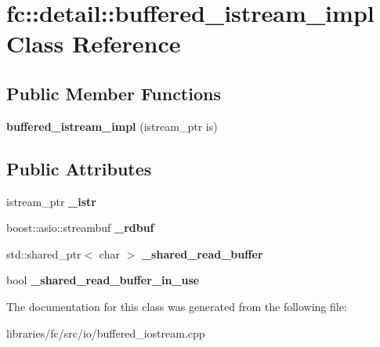 \hypertarget{classfc_1_1detail_1_1buffered__istream__impl}{}\section{fc\+:\+:detail\+:\+:buffered\+\_\+istream\+\_\+impl Class Reference}
\label{classfc_1_1detail_1_1buffered__istream__impl}
\subsection*{Public Member Functions}
\begin{DoxyCompactItemize}
\item 
\mbox{\label{classfc_1_1detail_1_1buffered__istream__impl_af20f26d197bdb35d0d6ecff86af7bad1}} 
{\bfseries buffered\+\_\+istream\+\_\+impl} (istream\+\_\+ptr is)
\end{DoxyCompactItemize}
\subsection*{Public Attributes}
\begin{DoxyCompactItemize}
\item 
\mbox{\label{classfc_1_1detail_1_1buffered__istream__impl_a4c7e115dea44a4c4304c25957987474f}} 
istream\+\_\+ptr {\bfseries \+\_\+istr}
\item 
\mbox{\label{classfc_1_1detail_1_1buffered__istream__impl_a478e492b90bded062eeef5880d60d621}} 
boost\+::asio\+::streambuf {\bfseries \+\_\+rdbuf}
\item 
\mbox{\label{classfc_1_1detail_1_1buffered__istream__impl_a9ba5510d813e3206c1052ff069a1929a}} 
std\+::shared\+\_\+ptr$<$ char $>$ {\bfseries \+\_\+shared\+\_\+read\+\_\+buffer}
\item 
\mbox{\label{classfc_1_1detail_1_1buffered__istream__impl_adf0f33b0bdafe179e2206ef2b5e6baed}} 
bool {\bfseries \+\_\+shared\+\_\+read\+\_\+buffer\+\_\+in\+\_\+use}
\end{DoxyCompactItemize}


The documentation for this class was generated from the following file\+:\begin{DoxyCompactItemize}
\item 
libraries/fc/src/io/buffered\+\_\+iostream.\+cpp\end{DoxyCompactItemize}
